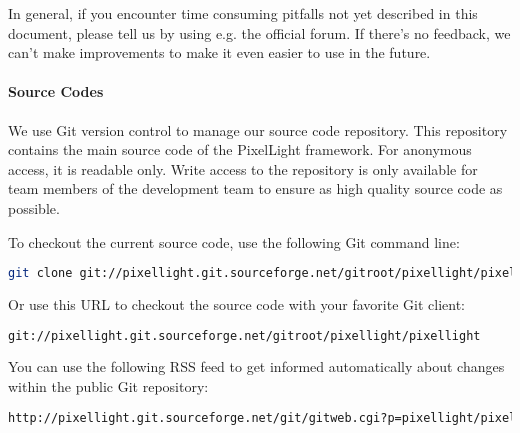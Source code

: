 In general, if you encounter time consuming pitfalls not yet described in this document, please tell us by using e.g. the official forum. If there's no feedback, we can't make improvements to make it even easier to use in the future.


\paragraph{Source Codes}
We use Git version control to manage our source code repository. This repository contains the main source code of the PixelLight framework. For anonymous access, it is readable only. Write access to the repository is only available for team members of the development team to ensure as high quality source code as possible.

To checkout the current source code, use the following Git command line:
\begin{lstlisting}[language=sh]
git clone git://pixellight.git.sourceforge.net/gitroot/pixellight/pixellight
\end{lstlisting}

Or use this URL to checkout the source code with your favorite Git client:
\begin{lstlisting}[language=sh]
git://pixellight.git.sourceforge.net/gitroot/pixellight/pixellight
\end{lstlisting}

You can use the following RSS feed to get informed automatically about changes within the public Git repository:
\begin{lstlisting}[language=sh]
http://pixellight.git.sourceforge.net/git/gitweb.cgi?p=pixellight/pixellight;a=rss
\end{lstlisting}

